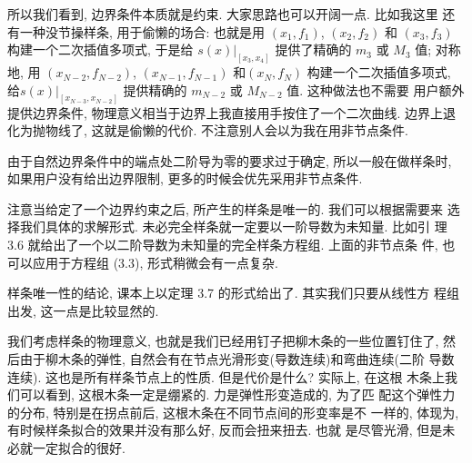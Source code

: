 \documentclass[a4paper]{ctexart}
\begin{document}
{所以我们看到, 边界条件本质就是约束. 大家思路也可以开阔一点. 比如我这里
还有一种没节操样条, 用于偷懒的场合: 也就是用 $(x_1, f_1)$, $(x_2,
f_2)$ 和 $(x_3, f_3)$ 构建一个二次插值多项式, 于是给
$\left.s(x)\right|_{[x_3, x_4]}$ 提供了精确的 $m_3$ 或 $M_3$ 值; 对称
地, 用 $(x_{N - 2}, f_{N - 2})$, $(x_{N - 1}, f_{N - 1})$ 和$(x_N,
f_N)$ 构建一个二次插值多项式, 给$\left.s(x)\right|_{[x_{N - 3}, x_{N -
      2}]}$ 提供精确的 $m_{N - 2}$ 或 $M_{N - 2}$ 值. 这种做法也不需要
用户额外提供边界条件, 物理意义相当于边界上我直接用手按住了一个二次曲线.
边界上退化为抛物线了, 这就是偷懒的代价. 不注意别人会以为我在用非节点条件. 

由于自然边界条件中的端点处二阶导为零的要求过于确定, 所以一般在做样条时, 
如果用户没有给出边界限制, 更多的时候会优先采用非节点条件. 

注意当给定了一个边界约束之后, 所产生的样条是唯一的. 我们可以根据需要来
选择我们具体的求解形式. 未必完全样条就一定要以一阶导数为未知量. 比如引
理 3.6 就给出了一个以二阶导数为未知量的完全样条方程组. 上面的非节点条
件, 也可以应用于方程组 (3.3), 形式稍微会有一点复杂.

样条唯一性的结论, 课本上以定理 3.7 的形式给出了. 其实我们只要从线性方
程组出发, 这一点是比较显然的. 

我们考虑样条的物理意义, 也就是我们已经用钉子把柳木条的一些位置钉住了,
然后由于柳木条的弹性, 自然会有在节点光滑形变(导数连续)和弯曲连续(二阶
导数连续). 这也是所有样条节点上的性质. 但是代价是什么? 实际上, 在这根
木条上我们可以看到, 这根木条一定是绷紧的. 力是弹性形变造成的, 为了匹
配这个弹性力的分布, 特别是在拐点前后, 这根木条在不同节点间的形变率是不
一样的, 体现为, 有时候样条拟合的效果并没有那么好, 反而会扭来扭去. 也就
是尽管光滑, 但是未必就一定拟合的很好.








}
\end{document}
